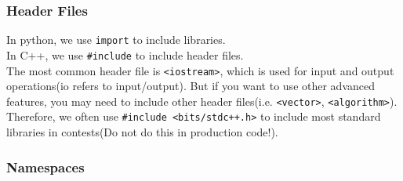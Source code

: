 \documentclass[xcolor=dvipsnames]{beamer}
\begin{document}
    \begin{frame}
        \frametitle{Header Files}
        In python, we use \texttt{import} to include libraries.\\
        In C++, we use \texttt{\#include} to include header files.\\
        The most common header file is \texttt{<iostream>}, which is used for input and output operations(io refers to input/output). But if you want to use other advanced features, you may need to include other header files(i.e. \texttt{<vector>}, \texttt{<algorithm>}). Therefore, we often use \texttt{\#include <bits/stdc++.h>} to include most standard libraries in contests(Do not do this in production code!).

    \end{frame}

    \begin{frame}
        \frametitle{Namespaces}
    \end{frame}
\end{document}
